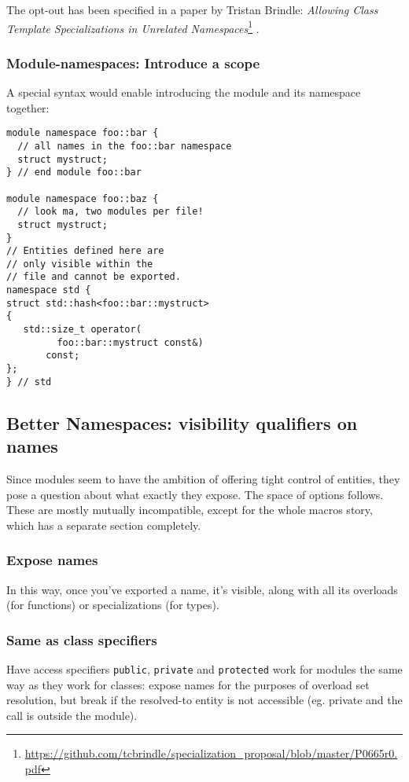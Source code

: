 \documentclass[reqno]{article}
\begin{document}
The opt-out has been specified in a paper by Tristan Brindle: \emph{Allowing
Class Template Specializations in Unrelated Namespaces}\footnote{
\url{https://github.com/tcbrindle/specialization_proposal/blob/master/P0665r0.pdf}}
.

\subsubsection{Module-namespaces: Introduce a scope}

A special syntax would enable introducing the module and its namespace together:

\begin{verbatim}
module namespace foo::bar {
  // all names in the foo::bar namespace
  struct mystruct;
} // end module foo::bar

module namespace foo::baz {
  // look ma, two modules per file!
  struct mystruct;
}
// Entities defined here are
// only visible within the
// file and cannot be exported.
namespace std {
struct std::hash<foo::bar::mystruct>
{
   std::size_t operator(
         foo::bar::mystruct const&)
       const;
};
} // std
\end{verbatim}


\subsection{Better Namespaces: visibility qualifiers on names}

Since modules seem to have the ambition of offering tight control of entities,
they pose a question about what exactly they expose. The space of options
follows. These are mostly mutually incompatible, except for the whole macros
story, which has a separate section completely.

\subsubsection{Expose names}
In this way, once you've exported a name, it's visible, along with all its
overloads (for functions) or specializations (for types).

\subsubsection{Same as class specifiers}
Have access specifiers \texttt{public}, \texttt{private} and \texttt{protected}
work for modules the same way as they work for classes: expose names for the
purposes of overload set resolution, but break if the resolved-to entity is
not accessible (eg. private and the call is outside the module).
\end{document}
